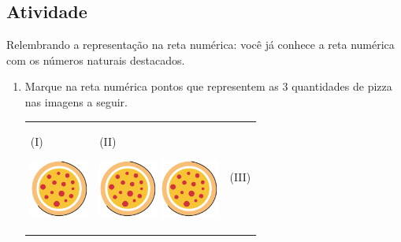 \subsection{Atividade}

Relembrando a representação na reta numérica: você já conhece a reta numérica com os números naturais destacados.


\begin{enumerate} [\quad a)] %
  \item     Marque na reta numérica pontos que representem as 3 quantidades de pizza nas imagens a seguir.

{\centering
\begin{tabular}{m{}m{}m{} }

\quad\;\; (I)

\includegraphics[width=55pt, keepaspectratio]{../figuras/licao03/pizza.png}  & \quad\quad \quad\quad(II)

\includegraphics[width=55pt, keepaspectratio]{../figuras/licao03/pizza.png} \includegraphics[width=55pt, keepaspectratio]{../figuras/licao03/pizza.png} & \quad\quad \quad\quad \; (III)


\end{tabular}}
\end{enumerate}
